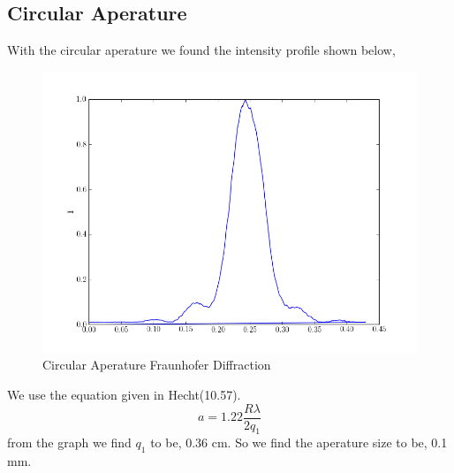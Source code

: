 \documentclass[paper=a4, fontsize=11pt]{scrartcl} %
\numberwithin{equation}{section}
\numberwithin{figure}{section}
\numberwithin{table}{section}
\begin{document}
\subsection{Circular Aperature}
With the circular aperature we found the intensity profile shown below,
\begin{figure}[H]
\caption{Circular Aperature Fraunhofer Diffraction}
\begin{center}
\includegraphics[scale=0.3]{circ}
\end{center}
\end{figure}
We use the equation given in Hecht(10.57).
\begin{equation}
a = 1.22\frac{R\lambda}{2q_1}
\end{equation}
from the graph we find $q_1$ to be, 0.36 cm. So we find the aperature size to be, 0.1 mm.
\end{document}
